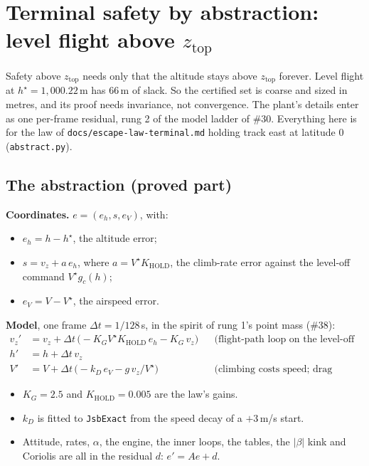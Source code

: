 \documentclass[11pt]{article}
\newcommand{\zTop}{z_{\mathrm{top}}}
\begin{document}
\section{Terminal safety by abstraction: level flight above $\zTop$}\label{sec:abstract}

Safety above $\zTop$ needs only that the altitude stays above $\zTop$ forever. Level flight at $h^\star = 1{,}000.22$\,m has 66\,m of slack. So the certified set is coarse and sized in metres, and its proof needs invariance, not convergence. The plant's details enter as one per-frame residual, rung 2 of the model ladder of \#30. Everything here is for the law of \texttt{docs/escape-law-terminal.md} holding track east at latitude 0 (\texttt{abstract.py}).

\subsection{The abstraction (proved part)}

\textbf{Coordinates.} $e = (e_h, s, e_V)$, with:
\begin{itemize}
\item $e_h = h - h^\star$, the altitude error;
\item $s = v_z + a\,e_h$, where $a = V^\star K_{\mathrm{HOLD}}$, the climb-rate error against the level-off command $V^\star g_c(h)$;
\item $e_V = V - V^\star$, the airspeed error.
\end{itemize}

\textbf{Model}, one frame $\Delta t = 1/128$\,s, in the spirit of rung 1's point mass (\#38):
\begin{align*}
v_z' &= v_z + \Delta t\,\bigl(-K_G V^\star K_{\mathrm{HOLD}}\,e_h - K_G\,v_z\bigr) && \text{(flight-path loop on the level-off command)}\\
h' &= h + \Delta t\, v_z\\
V' &= V + \Delta t\,\bigl(-k_D\,e_V - g\,v_z/V^\star\bigr) && \text{(climbing costs speed; drag restores it)}
\end{align*}
\begin{itemize}
\item $K_G = 2.5$ and $K_{\mathrm{HOLD}} = 0.005$ are the law's gains.
\item $k_D$ is fitted to \texttt{JsbExact} from the speed decay of a $+3$\,m/s start.
\item Attitude, rates, $\alpha$, the engine, the inner loops, the tables, the $|\beta|$ kink and Coriolis are all in the residual $d$: $e' = A e + d$.
\end{itemize}
\end{document}
